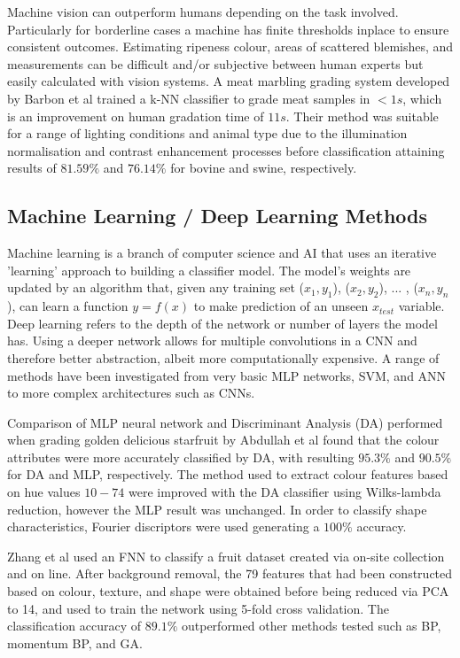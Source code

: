 \documentclass[fleqn,twoside]{article}
\begin{document}
Machine vision can outperform humans depending on the task involved. Particularly for borderline cases a machine has finite thresholds inplace to ensure consistent outcomes. Estimating ripeness colour, areas of scattered blemishes, and measurements can be difficult and/or subjective between human experts but easily calculated with vision systems. A meat marbling grading system developed by Barbon et al \cite{barbon} trained a k-NN classifier to grade meat samples in $<1s$, which is an improvement on human gradation time of $11s$. Their method was suitable for a range of lighting conditions and animal type due to the illumination normalisation and contrast enhancement processes before classification attaining results of $81.59\%$ and $76.14\%$ for bovine and swine, respectively. 



\subsection{Machine Learning / Deep Learning Methods}


Machine learning is a branch of computer science and AI that uses an iterative 'learning' approach to building a classifier model. The model's weights are updated by an algorithm that, given any training set ($x_1, y_1$), ($x_2, y_2$), ... , ($x_n, y_n$), can learn a function $y = f(x)$ to make prediction of an unseen $x_{test}$ variable. Deep learning refers to the depth of the network or number of layers the model has. Using a deeper network allows for multiple convolutions in a CNN and therefore better abstraction, albeit more computationally expensive. A range of methods have been investigated from very basic MLP networks, SVM, and ANN to more complex architectures such as CNNs.


Comparison of MLP neural network and Discriminant Analysis (DA) performed when grading golden delicious starfruit by Abdullah et al \cite{abdullah} found that the colour attributes were more accurately classified by DA, with resulting $95.3\%$ and $90.5\%$ for DA and MLP, respectively. The method used to extract colour features based on hue values $10-74$ were improved with the DA classifier using Wilks-lambda reduction, however the MLP result was unchanged. In order to classify shape characteristics, Fourier discriptors were used generating a $100\%$ accuracy.


Zhang et al \cite{zhang} used an FNN to classify a fruit dataset created via on-site collection and on line. After background removal, the 79 features that had been constructed based on colour, texture, and shape were obtained before being reduced via PCA to 14, and used to train the network using 5-fold cross validation. The classification accuracy of $89.1\%$ outperformed other methods tested such as BP, momentum BP, and GA. 
\end{document}
